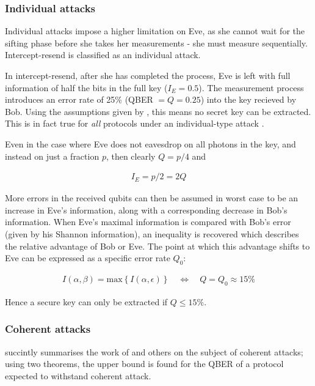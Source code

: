\documentclass[paper=a4, fontsize=11pt]{scrartcl} %
\numberwithin{equation}{section} %
\numberwithin{figure}{section} %
\numberwithin{table}{section} %
\begin{document}
\subsubsection*{Individual attacks}
Individual attacks impose a higher limitation on Eve, as she cannot wait for the sifting
phase before she takes her measurements - she must measure sequentially. Intercept-resend is classified as an individual attack.

In intercept-resend, after she has completed the process,
Eve is left with full information of half the bits in the full key ($I_E = 0.5$).
The measurement process introduces an error rate of 25\% (QBER $= Q = 0.25$)
into the key recieved by Bob. Using the assumptions given by \citet{csiszarAssump},
this means no secret key can be extracted. This is in fact true for \textit{all} protocols under an individual-type
attack \citep{reviewScariani}.

Even in the case where Eve does not eavesdrop on all photons in the key, and instead on just a fraction $p$,
then clearly $Q = p/4$ and

\begin{align}
I_E	= p/2 = 2Q
\end{align}

More errors in the received qubits can then be assumed in worst case to be an increase in Eve's information,
along with a corresponding decrease in Bob's information. When Eve's maximal information is compared with Bob's error
(given by his Shannon information), an inequality is recovered which describes the relative advantage of Bob or Eve.
The point at which this advantage shifts to Eve can be expressed as a specific error rate $Q_0$:

\begin{align}
	I(\alpha, \beta) = \mathrm{max} \left\{ I(\alpha, \epsilon) \right\}
	\quad
	\Leftrightarrow
	\quad
	Q = Q_0
	\approx 15\%
\end{align}

Hence a secure key can only be extracted if $Q \leq 15\%$. \citep{qber15proof, gisin2002, huttner1995}

\subsubsection*{Coherent attacks}
\citet{gisin2002} succintly summarises the work of \citet{proofBB84} and others
on the subject of coherent attacks; using two theorems, the upper bound is found for the QBER
of a protocol expected to withstand coherent attack.
\end{document}
